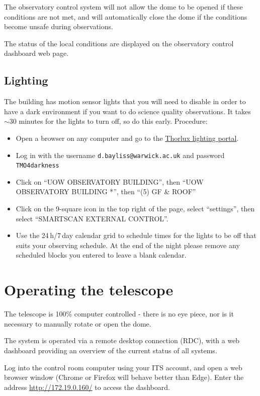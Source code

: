 \documentclass[12pt,a4paper]{article}
\begin{document}
The observatory control system will not allow the dome to be opened if these conditions are not met, and will automatically close the dome if the conditions become unsafe during observations.

The status of the local conditions are displayed on the observatory control dashboard web page.


\subsection{Lighting}
The building has motion sensor lights that you will need to disable in order to have a dark environment if you want to do science quality observations.  It takes $\sim30$ minutes for the lights to turn off, so do this early. Procedure:
\begin{itemize}
    \item Open a browser on any computer and go to the \href{https://www.smartscan.lighting/en/login}{Thorlux lighting portal}.
    \item Log in with the username \texttt{d.bayliss@warwick.ac.uk} and password \texttt{TMO4darkness}
    \item Click on ``{\footnotesize UOW OBSERVATORY BUILDING}'', then ``{\footnotesize UOW OBSERVATORY BUILDING *}'', then ``{\footnotesize (5) GF \& ROOF}''
    \item Click on the 9-square icon in the top right of the page, select ``settings'', then select ``{\footnotesize SMARTSCAN EXTERNAL CONTROL}''.
    \item Use the 24\,h/7\,day calendar grid to schedule times for the lights to be off that suits your observing schedule.  At the end of the night please remove any scheduled blocks you entered to leave a blank calendar.
    
\end{itemize}

\section{Operating the telescope}

The telescope is 100\% computer controlled - there is no eye piece, nor is it necessary to manually rotate or open the dome.

The system is operated via a remote desktop connection (RDC), with a web dashboard providing an overview of the current status of all systems.

Log into the control room computer using your ITS account, and open a web browser window (Chrome or Firefox will behave better than Edge). Enter the address \url{http://172.19.0.160/} to access the dashboard.
\end{document}
